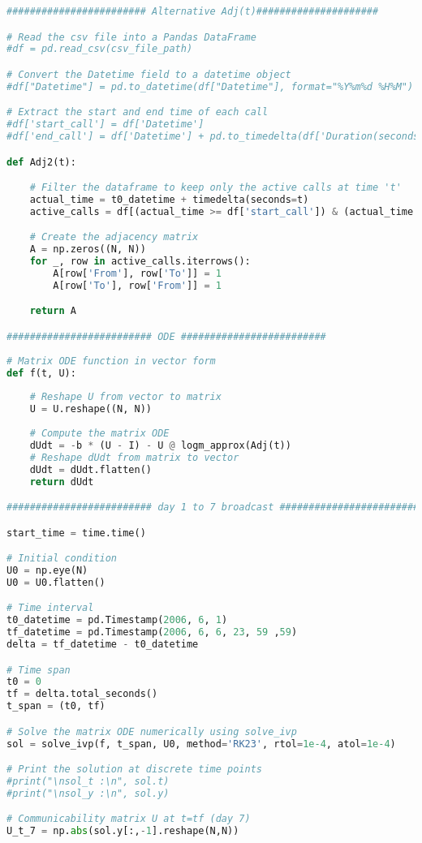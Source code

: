 \begin{lstlisting}[language=Python, caption=Second synthetic experiment]
######################## Alternative Adj(t)#####################

# Read the csv file into a Pandas DataFrame
#df = pd.read_csv(csv_file_path)

# Convert the Datetime field to a datetime object
#df["Datetime"] = pd.to_datetime(df["Datetime"], format="%Y%m%d %H%M")

# Extract the start and end time of each call
#df['start_call'] = df['Datetime']
#df['end_call'] = df['Datetime'] + pd.to_timedelta(df['Duration(seconds)'], unit='s')

def Adj2(t): 

    # Filter the dataframe to keep only the active calls at time 't'
    actual_time = t0_datetime + timedelta(seconds=t)
    active_calls = df[(actual_time >= df['start_call']) & (actual_time <= df['end_call'])]

    # Create the adjacency matrix
    A = np.zeros((N, N))
    for _, row in active_calls.iterrows():
        A[row['From'], row['To']] = 1
        A[row['To'], row['From']] = 1

    return A

######################### ODE #########################
    
# Matrix ODE function in vector form
def f(t, U):
    
    # Reshape U from vector to matrix
    U = U.reshape((N, N))
    
    # Compute the matrix ODE
    dUdt = -b * (U - I) - U @ logm_approx(Adj(t))
    # Reshape dUdt from matrix to vector
    dUdt = dUdt.flatten()
    return dUdt

######################### day 1 to 7 broadcast #########################

start_time = time.time()

# Initial condition 
U0 = np.eye(N)
U0 = U0.flatten()

# Time interval 
t0_datetime = pd.Timestamp(2006, 6, 1)
tf_datetime = pd.Timestamp(2006, 6, 6, 23, 59 ,59)
delta = tf_datetime - t0_datetime

# Time span
t0 = 0
tf = delta.total_seconds() 
t_span = (t0, tf) 

# Solve the matrix ODE numerically using solve_ivp
sol = solve_ivp(f, t_span, U0, method='RK23', rtol=1e-4, atol=1e-4)

# Print the solution at discrete time points
#print("\nsol_t :\n", sol.t)
#print("\nsol_y :\n", sol.y)

# Communicability matrix U at t=tf (day 7)
U_t_7 = np.abs(sol.y[:,-1].reshape(N,N))


\end{lstlisting}
